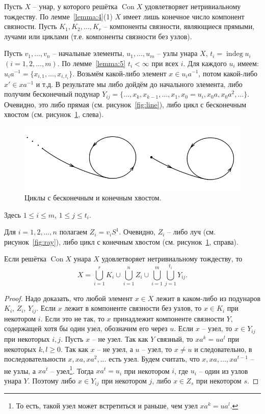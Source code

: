 \documentclass[11pt,twoside,final
]{article}
\def\Con{\operatorname{Con}}
\def\indeg{\operatorname{indeg}}
\begin{document}
Пусть $X$ -- унар, у которого решётка $\Con X$ удовлетворяет нетривиальному тождеству.
По лемме~\ref{lemma:4}(1) $X$ имеет лишь конечное число компонент связности.
Пусть $K_1, K_2, \ldots, K_r$ -- компоненты связности, являющиеся прямыми, лучами или циклами (т.е. компоненты связности без узлов).

Пусть $v_1, \ldots, v_n$ -- начальные элементы, $u_1, \ldots, u_m$ -- узлы унара $X$, $t_i = \indeg u_i$ $(i = 1,2,\ldots, m)$.
По лемме~\ref{lemma:5} $t_i < \infty$ при всех $i$.
Для каждого $u_i$ имеем: $u_i a^{-1} = \{ x_{i,1}, \ldots, x_{i, t_i} \}$.
Возьмём какой-либо элемент $x \in u_i a^{-1}$, потом какой-либо $x' \in xa^{-1}$ и т.д.
В результате мы либо дойдём до начального элемента, либо получим бесконечный подунар $Y_{ij} = \{ \ldots, x_k, x_{k -1}, \ldots, x_1, x_0 = u_i, x_0 a, x_0 a^2, \ldots \}$.
Очевидно, это либо прямая (см. рисунок~\ref{fig:line}), либо цикл с бесконечным хвостом (см. рисунок~\ref{fig:cycles}, слева).
\begin{figure}[ht!]
	\centering
	\includegraphics[scale=0.5]{img/cycles.png}
	\caption{Циклы с бесконечным и конечным хвостом.}
	\label{fig:cycles}
\end{figure}
Здесь $1 \leqslant i \leqslant m$, $1 \leqslant j \leqslant t_i$.

Для $i = 1,2, \ldots, n$ полагаем $Z_i = v_i S^1$.
Очевидно, $Z_i$ -- либо луч (см. рисунок~\ref{fig:ray}), либо цикл с конечным хвостом (см. рисунок~\ref{fig:cycles}, справа).

\begin{lemma} \label{lemma:8}
	Если решётка $\Con X$ унара $X$ удовлетворяет нетривиальному тождеству, то
	\[
		X = \bigcup_{i=1}^{r} K_i \cup \bigcup_{i=1}^{n} Z_i \cup \bigcup_{i=1}^{m} \bigcup_{j=1}^{t_i} Y_{ij}.
	\]
\end{lemma}
\begin{proof}
	Надо доказать, что любой элемент $x \in X$ лежит в каком-либо из подунаров $K_i$, $Z_i$, $Y_{ij}$.
	Если $x$ лежит в компоненте связности без узлов, то $x \in K_i$ при некотором $i$.
	Если это не так, то $x$ принадлежит компоненте связности $Y$, содержащей хотя бы один узел, обозначим его через $u$.
	Если $x$ -- узел, то $x \in Y_{ij}$ при некоторых $i,j$.
	Пусть $x$ -- не узел.
	Так как $Y$ связный, то $x a^k = u a^l$ при некоторых $k,l \geqslant 0$.
	Так как $x$ -- не узел, а $u$ -- узел, то $x \neq u$ и следовательно, в последовательности $x, xa, x a^2, \ldots$ есть узел.
	Будем считать, что $x, xa, \ldots, x a^{t - 1}$ -- не узлы, а $x a^t$ -- узел\footnote{То есть, такой узел может встретиться и раньше, чем узел $x a^k = u a^l$.}.
	Тогда $x a^t = u_i$ при некотором $i$, где $u_i$ -- один из узлов унара $Y$.
	Поэтому либо $x \in Y_{ij}$ при некотором $j$, либо $x \in Z_s$ при некотором $s$.
\end{proof}
\end{document}
